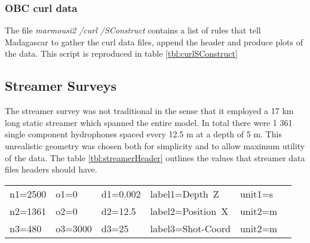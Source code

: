 

\subsubsection{OBC curl data}
The file \emph{marmousi2 \slash curl \slash SConstruct} contains a list of rules that tell Madagascar to gather the 
curl data files, append the header and produce plots of the data.  This script is reproduced 
in table \ref{tbl:curlSConstruct}
{
\tiny

\normalsize
}

\subsection{Streamer Surveys}
The streamer survey was not traditional in the sense that it employed a 17 km long static streamer which spanned the entire
model.  In total there were 1 361 single component hydrophones spaced every 12.5 m at a depth of 5 m.  This unrealistic geometry
was chosen both for simplicity and to allow maximum utility of the data.  The table \ref{tbl:streamerHeader} outlines the 
values that streamer data files headers should have.    

{
\begin{tabular}[t]{|llllll|}
        \hline
        n1=2500    &   o1=0     &   d1=0.002    &    label1=Depth\ Z     &  unit1=s  &  \\
        n2=1361    &   o2=0     &   d2=12.5     &    label2=Position\ X  &  unit2=m  &  \\
	n3=480 	   &   o3=3000  &   d3=25	&    label3=Shot-Coord   &  unit2=m  &  \\
        \hline
\end{tabular}
}
